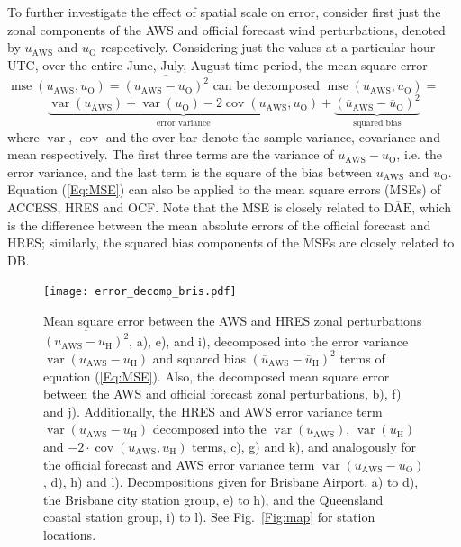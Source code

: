 \documentclass[twocol]{ametsoc}
\DeclareMathOperator{\mse}{mse}
\DeclareMathOperator{\cov}{cov}
\DeclareMathOperator{\var}{var}
\begin{document}
To further investigate the effect of spatial scale on error, consider first just the zonal components of the AWS and official forecast wind perturbations, denoted by $u_\text{AWS}$ and $u_\text{O}$ respectively. Considering just the values at a particular hour UTC, over the entire June, July, August time period, the mean square error $\mse\left(u_\text{AWS}, u_\text{O}\right) = \overline{\left(u_\text{AWS} - u_\text{O}\right)^2}$ can be decomposed $\mse\left(u_\text{AWS}, u_\text{O}\right)=$ 
\begin{equation}
\underbrace{\var\left(u_\text{AWS}\right) + \var\left(u_\text{O}\right) - 2\cov\left(u_\text{AWS}, u_\text{O}\right)}_\text{error variance} + \underbrace{\left(\overline{u}_\text{AWS} - \overline{u}_\text{O}\right)^2}_{\text{squared bias}} \label{Eq:MSE}
\end{equation}
where $\var$, $\cov$ and the over-bar denote the sample variance, covariance and mean respectively. The first three terms are the variance of $u_\text{AWS} - u_\text{O}$, i.e. the error variance, and the last term is the square of the bias between $u_\text{AWS}$ and $u_\text{O}$. Equation (\ref{Eq:MSE}) can also be applied to the mean square errors (MSEs) of ACCESS, HRES and OCF. Note that the MSE is closely related to $\overline{\text{DAE}}$, which is the difference between the mean absolute errors of the official forecast and HRES; similarly, the squared bias components of the MSEs are closely related to $\text{DB}$. 

\begin{figure}
\centering
\texttt{[image: error\_decomp\_bris.pdf]}
\caption{Mean square error between the AWS and HRES zonal perturbations $\overline{\left(u_\text{AWS} - u_\text{H}\right)^2}$, a), e), and i), decomposed into the error variance $\var\left(u_\text{AWS} - u_\text{H}\right)$ and squared bias $\left(\overline{u}_\text{AWS} - \overline{u}_\text{H}\right)^2$ terms of equation (\ref{Eq:MSE}). Also, the decomposed mean square error between the AWS and official forecast zonal perturbations, b), f) and j). Additionally, the HRES and AWS error variance term $\var\left(u_\text{AWS} - u_\text{H}\right)$ decomposed into the $\var\left(u_\text{AWS}\right)$, $\var\left(u_\text{H}\right)$ and  $- 2 \cdot \cov\left(u_\text{AWS}, u_\text{H}\right)$ terms, c), g) and k), and analogously for the official forecast and AWS error variance term $\var\left(u_\text{AWS} - u_\text{O}\right)$, d), h) and l). Decompositions given for Brisbane Airport, a) to d), the Brisbane city station group, e) to h), and the Queensland coastal station group, i) to l). See Fig.~\ref{Fig:map} for station locations.}
\label{Fig:error_decomp_bris}
\end{figure}
\end{document}
